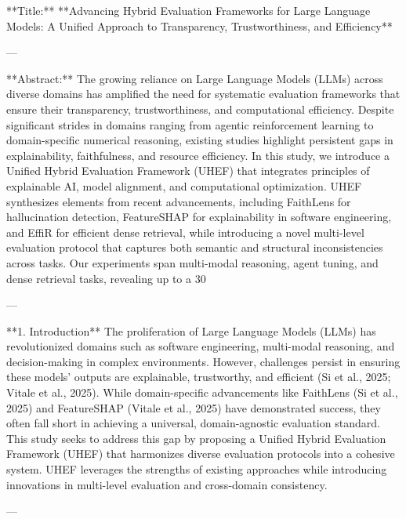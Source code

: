 **Title:**  
**Advancing Hybrid Evaluation Frameworks for Large Language Models: A Unified Approach to Transparency, Trustworthiness, and Efficiency**

---

**Abstract:**  
The growing reliance on Large Language Models (LLMs) across diverse domains has amplified the need for systematic evaluation frameworks that ensure their transparency, trustworthiness, and computational efficiency. Despite significant strides in domains ranging from agentic reinforcement learning to domain-specific numerical reasoning, existing studies highlight persistent gaps in explainability, faithfulness, and resource efficiency. In this study, we introduce a Unified Hybrid Evaluation Framework (UHEF) that integrates principles of explainable AI, model alignment, and computational optimization. UHEF synthesizes elements from recent advancements, including FaithLens for hallucination detection, FeatureSHAP for explainability in software engineering, and EffiR for efficient dense retrieval, while introducing a novel multi-level evaluation protocol that captures both semantic and structural inconsistencies across tasks. Our experiments span multi-modal reasoning, agent tuning, and dense retrieval tasks, revealing up to a 30%

---

**1. Introduction**  
The proliferation of Large Language Models (LLMs) has revolutionized domains such as software engineering, multi-modal reasoning, and decision-making in complex environments. However, challenges persist in ensuring these models' outputs are explainable, trustworthy, and efficient (Si et al., 2025; Vitale et al., 2025). While domain-specific advancements like FaithLens (Si et al., 2025) and FeatureSHAP (Vitale et al., 2025) have demonstrated success, they often fall short in achieving a universal, domain-agnostic evaluation standard. This study seeks to address this gap by proposing a Unified Hybrid Evaluation Framework (UHEF) that harmonizes diverse evaluation protocols into a cohesive system. UHEF leverages the strengths of existing approaches while introducing innovations in multi-level evaluation and cross-domain consistency.

---

